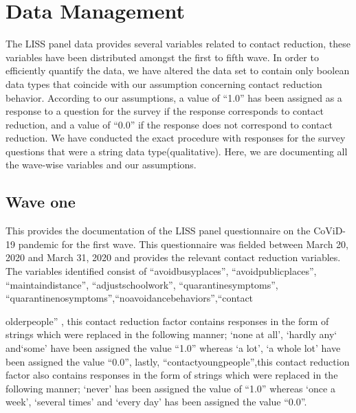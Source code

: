 \documentclass[11pt, a4paper, leqno]{article}
\begin{document}
\section{Data Management}
The LISS panel data provides several variables related to contact reduction, these variables have been distributed amongst the first to fifth wave. In order to efficiently quantify the data, we have altered the data set to contain only boolean data types that coincide with our assumption concerning contact reduction behavior. According to our assumptions, a value of ``1.0'' has been assigned as a response to a question for the survey if the response corresponds to contact reduction, and a value of ``0.0'' if the response does not correspond to contact reduction. We have conducted the exact procedure with responses for the survey questions that were a string data type(qualitative). Here, we are documenting all the wave-wise variables and our assumptions. 

\subsection{Wave one}
This provides the documentation of the LISS panel questionnaire on the CoViD-19 pandemic for the first wave. This questionnaire was fielded between March 20, 2020 and March 31, 2020 and provides the relevant contact reduction variables. The variables identified consist of ``avoid\textunderscore busy\textunderscore places'',
``avoid\textunderscore public\textunderscore places'',
``maintain\textunderscore distance'', ``adjust\textunderscore school\textunderscore work'',  ``quarantine\textunderscore symptoms'',
``quarantine\textunderscore no\textunderscore symptoms'',``no\textunderscore avoidance\textunderscore behaviors'',``contact\textunderscore 

older\textunderscore people'' , this contact reduction factor contains responses in the form of strings which were replaced in the following manner; `none at all', `hardly any` and`some' have been assigned the value ``1.0'' whereas `a lot', `a whole lot' have been assigned the value ``0.0'', lastly, ``contact\textunderscore young\textunderscore people'',this contact reduction factor also contains responses in the form of strings which were replaced in the following manner;  `never' has been assigned the value of ``1.0'' whereas  
`once a week', `several times' and `every day' has been assigned the value ``0.0''.
\end{document}
